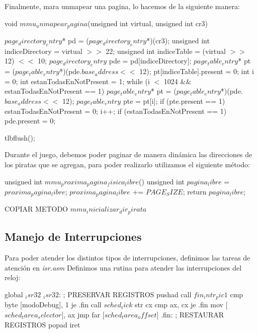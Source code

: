 Finalmente, mara unmapear una pagina, lo hacemos de la siguiente manera:
\begin{algorithmic}
     
\State \tab void $mmu_unmapear_pagina$(unsigned int virtual, unsigned int cr3) {
  \State \tab \tab $page_directory_entry$* pd = ($page_directory_entry$*)(cr3);
  \State \tab \tab unsigned int indiceDirectory = virtual $>>$ 22;
  \State \tab \tab unsigned int indiceTable = (virtual $>>$ 12) $<<$ 10;
  \State \tab \tab $page_directory_entry$ pde = pd[indiceDirectory];
  \State \tab \tab $page_table_entry$* pt = ($page_table_entry$*)(pde.$base_address <<$ 12);
  \State \tab \tab pt[indiceTable].present = 0;
  \State \tab \tab int i = 0;
  \State \tab \tab int estanTodasEnNotPresent = 1;
  \State \tab \tab while (i $<$ 1024 $\&\&$ estanTodasEnNotPresent == 1) {
    \State \tab \tab \tab $page_table_entry$* pt = ($page_table_entry$*)(pde.$base_address <<$ 12);
    \State \tab \tab \tab $page_table_entry$ pte = pt[i];
    \State \tab \tab \tab if (pte.present == 1) {
      \State \tab \tab \tab \tab estanTodasEnNotPresent = 0;
    \State \tab \tab \tab }
    \State \tab \tab \tab i++;
  \State \tab \tab }
  \State \tab \tab if (estanTodasEnNotPresent == 1) {
    \State \tab \tab \tab pde.present = 0;
  \State \tab \tab  }

  \State \tab \tab tlbflush();
\State \tab  }
\end{algorithmic}

Durante el juego, debemos poder paginar de manera din\'amica las direcciones de los piratas que se agregan, para poder realizarlo utilizamos el siguiente m\'etodo:
\begin{algorithmic}
    \State \tab unsigned int $mmu_proxima_pagina_fisica_libre$() {
  \State \tab \tab unsigned int $pagina_libre$ = $proxima_pagina_libre$;
  \State \tab \tab $proxima_pagina_libre$ += $PAGE_SIZE$;
  \State \tab \tab return $pagina_libre$;
\State \tab }
\end{algorithmic}

COPIAR METODO $mmu_inicializar_dir_pirata$


\subsection{Manejo de Interrupciones}
Para poder atender los distintos tipos de interrupciones, definimos las tareas de atenci\'on en \textit{isr.asm}
Definimos una rutina para atender las interrupciones del reloj:
\begin{algorithmic}
    \State \tab global $_isr32$
\State \tab $_isr32$:
	\State \tab \tab; PRESERVAR REGISTROS
  \State \tab \tab pushad
  \State \tab \tab call $fin_intr_pic1$
  \State \tab \tab cmp byte [modoDebug], 1
  \State \tab \tab je .fin
\State \tab \tab 	call $sched_tick$
  \State \tab \tab str cx
  \State \tab \tab cmp ax, cx
  \State \tab \tab je .fin
  \State \tab \tab mov [$sched_tarea_selector$], ax
  \State \tab \tab jmp far [$sched_tarea_offset$]
\State \tab \tab .fin:
	\State \tab \tab ; RESTAURAR REGISTROS
  \State \tab popad
  \State \tab iret
\end{algorithmic}

